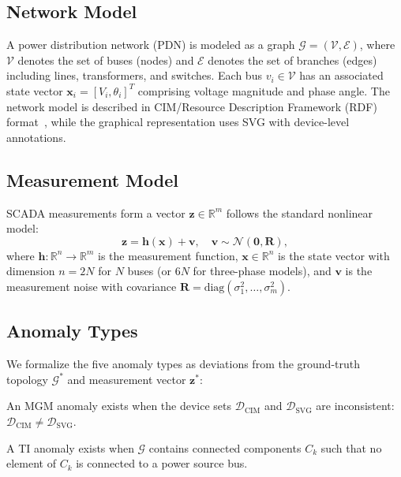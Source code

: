 \documentclass[research]{fcs}
\begin{document}
\subsection{Network Model}

A power distribution network (PDN) is modeled as a graph $\mathcal{G} = (\mathcal{V}, \mathcal{E})$, where $\mathcal{V}$ denotes the set of buses (nodes) and $\mathcal{E}$ denotes the set of branches (edges) including lines, transformers, and switches. Each bus $v_i \in \mathcal{V}$ has an associated state vector $\mathbf{x}_i = [V_i, \theta_i]^T$ comprising voltage magnitude and phase angle. The network model is described in CIM/Resource Description Framework (RDF) format~\cite{cim2013energy,rdf_w3c}, while the graphical representation uses SVG with device-level annotations.

\subsection{Measurement Model}

SCADA measurements form a vector $\mathbf{z} \in \mathbb{R}^m$ follows the standard nonlinear model:
\begin{equation}
\mathbf{z} = \mathbf{h}(\mathbf{x}) + \mathbf{v}, \quad \mathbf{v} \sim \mathcal{N}(\mathbf{0}, \mathbf{R}),
\end{equation}
where $\mathbf{h}: \mathbb{R}^n \to \mathbb{R}^m$ is the measurement function, $\mathbf{x} \in \mathbb{R}^n$ is the state vector with dimension $n = 2N$ for $N$ buses (or $6N$ for three-phase models), and $\mathbf{v}$ is the measurement noise with covariance $\mathbf{R} = \text{diag}(\sigma_1^2, \ldots, \sigma_m^2)$.

\subsection{Anomaly Types}

We formalize the five anomaly types as deviations from the ground-truth topology $\mathcal{G}^*$ and measurement vector $\mathbf{z}^*$:

\begin{definition}
An MGM anomaly exists when the device sets $\mathcal{D}_{\text{CIM}}$ and $\mathcal{D}_{\text{SVG}}$ are inconsistent: $\mathcal{D}_{\text{CIM}} \neq \mathcal{D}_{\text{SVG}}$.
\end{definition}

\begin{definition}
A TI anomaly exists when $\mathcal{G}$ contains connected components $C_k$ such that no element of $C_k$ is connected to a power source bus.
\end{definition}
\end{document}
